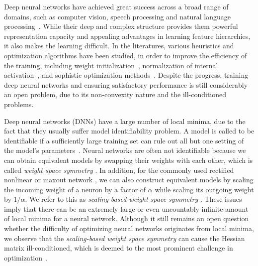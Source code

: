\documentclass[twocolumn]{article}
\begin{document}
Deep neural networks have achieved great success across a broad range of domains, such as computer vision, speech processing and natural language processing~\cite{2015_CVPR_He,2014_ICASSP_Wiesler,2017_AAAI_Tu}. While their deep and complex structure provides them powerful representation capacity and appealing advantages in learning feature hierarchies, it also makes the learning difficult. In the literatures, various heuristics and optimization algorithms have been studied, in order to improve the efficiency of the training, including weight initialization~\cite{1998_NN_Yann,2010_AISTATS_Glorot,2015_ICCV_He}, normalization of internal activation~\cite{2015_ICML_Ioffe}, and sophistic optimization methods~\cite{2015_ICML_Grosse,2017_Corr_Yu}. Despite the progress, training deep neural networks and ensuring satisfactory performance is still considerably an open problem, due to its non-convexity nature and the ill-conditioned problems.

Deep neural networks (DNNs) have a large number of local minima, due to the fact that they usually suffer model identifiability problem. A model is called to be identifiable if a sufficiently large training set can rule out all but one setting of the model's parameters~\cite{Goodfellow-et-al-2016}. Neural networks are often not identifiable because we can obtain equivalent models by swapping their weights with each other, which is called \emph{weight space symmetry} \cite{1993_NC_Chen}. In addition, for the commonly used rectified nonlinear \cite{2010_ICML_Nair} or maxout network \cite{Goodfellow_CoRR_2013}, we can also construct equivalent models by scaling the incoming weight of a neuron by a factor of $\alpha$ while scaling its outgoing weight by $1/ \alpha$. We refer to this as \emph{scaling-based weight space symmetry} \cite{2015_NIPS_Neyshabur}. These issues imply that there can be an extremely large or even uncountably infinite amount of local minima for a neural network. Although it still remains an open question whether the difficulty of optimizing neural networks originates from local minima, we observe that the \emph{scaling-based weight space symmetry} can cause the  Hessian matrix ill-conditioned, which is deemed to the most prominent challenge in optimization~\cite{2010_AISTATS_Glorot,2016_CoRR_Salimans}.
\end{document}
